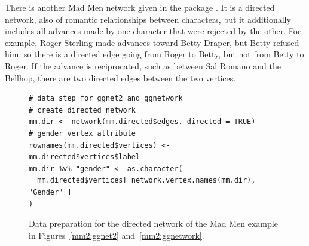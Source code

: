  There is another Mad Men network given in the  package \citep{madmen}. It is a directed network, also of romantic relationships between characters, but it additionally includes all advances made by one character that were rejected by the other.  For example, Roger Sterling made advances toward Betty Draper, but Betty refused him,  so there is a directed edge going from Roger to Betty, but not from Betty to Roger.  If the advance is reciprocated, such as between Sal Romano and the Bellhop, there are two directed edges between the two vertices.

\begin{figure}
\begin{knitrout}
\color{fgcolor}\begin{kframe}
\begin{verbatim}
# data step for ggnet2 and ggnetwork
# create directed network
mm.dir <- network(mm.directed$edges, directed = TRUE)
# gender vertex attribute
rownames(mm.directed$vertices) <- mm.directed$vertices$label
mm.dir %v% "gender" <- as.character(
  mm.directed$vertices[ network.vertex.names(mm.dir), "Gender" ]
)
\end{verbatim}
\end{kframe}
\end{knitrout}
\caption{\label{mm2:datastep} Data preparation for the directed network of the  Mad Men example in Figures~\ref{mm2:ggnet2} and~\ref{mm2:ggnetwork}.}

\end{figure}
